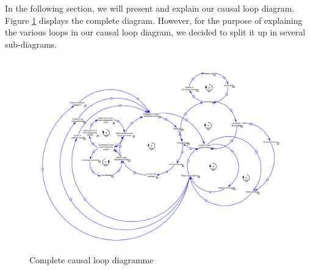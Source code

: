 In the following section, we will present and explain our causal loop diagram. Figure \ref{fig:fullcld} displays the complete diagram. However, for the purpose of explaining the various loops in our causal loop diagram, we decided to split it up in several sub-diagrams. 

\begin{figure}[H]
\centering
\includegraphics [scale=0.34,angle=90]{figures/fullcld.png}
\caption{Complete causal loop diagramme}
\label{fig:fullcld}
\end{figure}